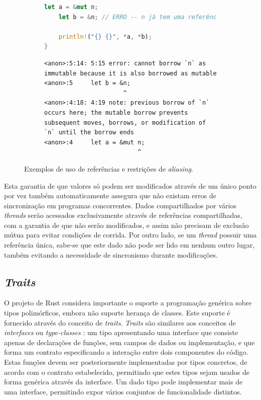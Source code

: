 \documentclass[tg]{mdtufsm}
\newcommand{\todo}[1]{}
\begin{document}
\begin{figure}
\begin{subfigure}[c]{0.48\textwidth}
\begin{lstlisting}[language=Rust]
	let a = &mut n;
	let b = &n; // ERRO -- n já tem uma referência mutável

	println!("{} {}", *a, *b);
}
	\end{lstlisting}
	\begin{lstlisting}[numbers=none, breaklines=true]
<anon>:5:14: 5:15 error: cannot borrow `n` as immutable because it is also borrowed as mutable
<anon>:5     let b = &n;
                      ^
<anon>:4:18: 4:19 note: previous borrow of `n` occurs here; the mutable borrow prevents subsequent moves, borrows, or modification of `n` until the borrow ends
<anon>:4     let a = &mut n;
                          ^
	\end{lstlisting}
	\caption{}
	\label{code:aliasing:mut2}
	\end{subfigure}
	\caption{Exemplos de uso de referências e restrições de \emph{aliasing}.}
	\label{code:aliasing}
\end{figure}

Esta garantia de que valores só podem ser modificados através de um único ponto por vez também automaticamente assegura que não existam erros de sincronização em programas concorrentes. Dados compartilhados por vários \emph{threads} serão acessados exclusivamente através de referências compartilhadas, com a garantia de que não serão modificados, e assim não precisam de exclusão mútua para evitar condições de corrida. Por outro lado, se um \emph{thread} possuir uma referência única, sabe-se que este dado não pode ser lido em nenhum outro lugar, também evitando a necessidade de sincronismo durante modificações.

\subsection{\emph{Traits}}

O projeto de Rust considera importante o suporte a programação genérica sobre tipos polimórficos, embora não suporte herança de classes. Este suporte é fornecido através do conceito de \emph{traits}. \emph{Traits} são similares aos conceitos de \emph{interfaces} ou \emph{type-classes} \citep{wadler1989}: um tipo apresentando uma interface que consiste apenas de declarações de funções, sem campos de dados ou implementação, e que forma um contrato especificando a interação entre dois componentes do código. Estas funções devem ser posteriormente implementadas por tipos concretos, de acordo com o contrato estabelecido, permitindo que estes tipos sejam usados de forma genérica através da interface. Um dado tipo pode implementar mais de uma interface, permitindo expor vários conjuntos de funcionalidade distintos. \citep{rust-guide} \todo{exemplo}
\end{document}
